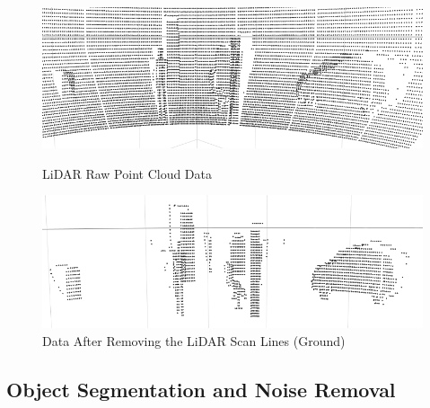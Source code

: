 \begin{figure}[!ht]
\centering
\begin{minipage}{0.49\textwidth}
  \centering
        \includegraphics[width=.9\linewidth]{images/ground_before2.png}
        \caption{LiDAR Raw Point Cloud Data}
        \label{fig:ground_before}
\end{minipage}%
\begin{minipage}{0.49\textwidth}
  \centering
        \includegraphics[width=.9\linewidth]{images/ground_after2.png}
        \caption{Data After Removing the LiDAR Scan Lines (Ground)}
        \label{fig:after}
\end{minipage}%
\end{figure}





\subsection{Object Segmentation and Noise Removal}










